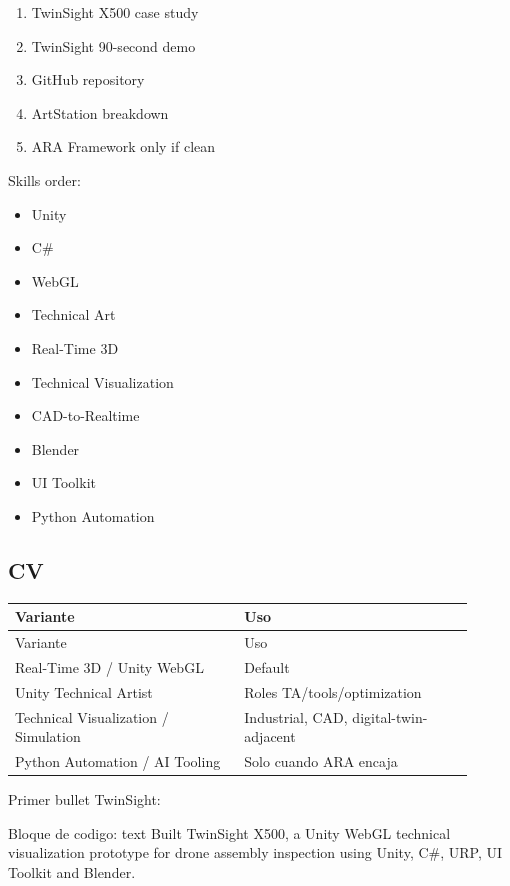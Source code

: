 \begin{enumerate}
\item TwinSight X500 case study
\item TwinSight 90-second demo
\item GitHub repository
\item ArtStation breakdown
\item ARA Framework only if clean
\end{enumerate}


Skills order:


\begin{itemize}
\item Unity
\item C\#
\item WebGL
\item Technical Art
\item Real-Time 3D
\item Technical Visualization
\item CAD-to-Realtime
\item Blender
\item UI Toolkit
\item Python Automation
\end{itemize}


\subsection{CV}


\begin{center}
\scriptsize
\begin{longtable}{>{\raggedright\arraybackslash}p{0.455\linewidth} >{\raggedright\arraybackslash}p{0.455\linewidth}}
\toprule
Variante & Uso \\
\midrule
\endfirsthead
\toprule
Variante & Uso \\
\midrule
\endhead
Real-Time 3D / Unity WebGL & Default \\
Unity Technical Artist & Roles TA/tools/optimization \\
Technical Visualization / Simulation & Industrial, CAD, digital-twin-adjacent \\
Python Automation / AI Tooling & Solo cuando ARA encaja \\
\bottomrule
\end{longtable}
\end{center}


Primer bullet TwinSight:


\begin{mdcode}
Bloque de codigo: text
Built TwinSight X500, a Unity WebGL technical visualization prototype for drone assembly inspection using Unity, C#, URP, UI Toolkit and Blender.
\end{mdcode}


